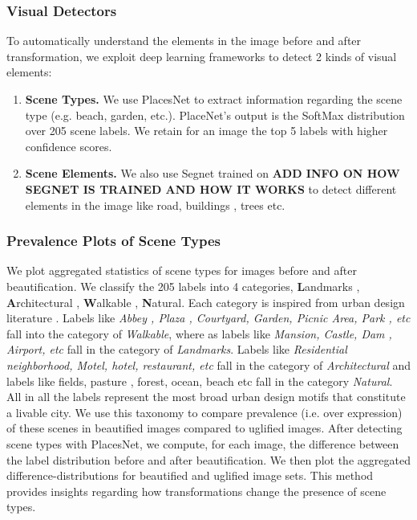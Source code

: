 \subsubsection{Visual Detectors}
To automatically understand the elements in the image before and after transformation, we exploit deep learning frameworks to detect 2 kinds of visual elements:
\begin{enumerate}
\item \textbf{Scene Types.} We use PlacesNet \cite{zhou2014learning} to extract information regarding the scene type (e.g. beach, garden, etc.). PlaceNet's output is the SoftMax distribution over 205 scene labels. We retain for an image the top 5 labels with higher confidence scores.
\item \textbf{Scene Elements.} We also use  Segnet \cite{badrinarayanan2015segnet} trained on \textbf{ADD INFO ON HOW SEGNET IS TRAINED AND HOW IT WORKS} to detect different elements in the image like road, buildings , trees etc.
\end{enumerate}

\subsubsection{Prevalence Plots of Scene Types}
We plot aggregated statistics of scene types for images before and after beautification. %
We classify the 205 labels into 4 categories, \textbf{L}andmarks , \textbf{A}rchitectural , \textbf{W}alkable , \textbf{N}atural. Each category is inspired from  urban design literature \cite{urbanDesign}.  Labels like \textit{Abbey , Plaza , Courtyard, Garden, Picnic Area, Park , etc} fall into the category of \textit{Walkable}, where as labels like \textit{Mansion, Castle, Dam , Airport, etc} fall in the category of \textit{Landmarks}. Labels like \textit{Residential neighborhood, Motel, hotel, restaurant, etc} fall in the category of \textit{Architectural} and labels like {fields, pasture , forest, ocean, beach etc } fall in the category \textit{Natural}. All in all the labels represent the most broad urban design motifs that constitute a livable city. 
We use this taxonomy to compare prevalence (i.e. over expression) of these scenes in beautified images compared to uglified images. After detecting scene types with PlacesNet, we compute, for each image, the difference between the label distribution before and after beautification. We then plot the aggregated difference-distributions for beautified and uglified image sets.%
This method provides insights regarding how transformations change the presence of scene types.


